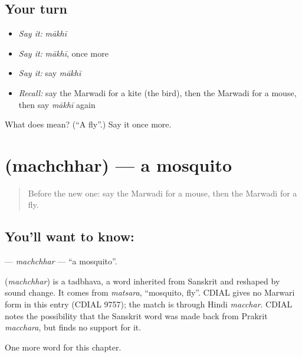 \subsection*{Your turn}
\begin{itemize}
\raggedright
  \item \emph{Say it:} \emph{mākhī}
  \item \emph{Say it:} \emph{mākhī}, once more
  \item \emph{Say it:} say \emph{mākhī}
  \item \emph{Recall:} say the Marwadi for a kite (the bird), then the Marwadi for a mouse, then say \emph{mākhī} again
\end{itemize}

\begin{tcolorbox}[breakable,colback=teal!4,colframe=teal!35!black,title={Before you move on}]
What does  mean? (\textquotedblleft{}A fly\textquotedblright{}.) Say it once more.
\end{tcolorbox}
\section[\texorpdfstring{\mw{मच्छर} (machchhar)}{मच्छर (machchhar)}]{ (machchhar) — a mosquito}

\label{lesson:MW-C140-machchhar}



\begin{quote}
Before the new one: say the Marwadi for a mouse, then the Marwadi for a fly.
\end{quote}

\subsection*{You'll want to know: }
\textbf{} — \emph{machchhar} — \textquotedblleft{}a mosquito\textquotedblright{}.

\begin{cousinweb}
\textbf{} (\emph{machchhar}) is a tadbhava, a word inherited from Sanskrit and reshaped by sound change. It comes from \emph{matsara}, \textquotedblleft{}mosquito, fly\textquotedblright{}. CDIAL gives no Marwari form in this entry (CDIAL 9757); the match is through Hindi \emph{macchar}. CDIAL notes the possibility that the Sanskrit word was made back from Prakrit \emph{macchara}, but finds no support for it.
\end{cousinweb}

\begin{grammarlens}[title={What you've built}]
One more word for this chapter.
\end{grammarlens}

